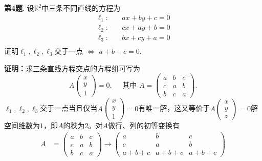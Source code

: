 \newpageorvspace

{\bf 第4题}. 设$\mathbb{R}^2$中三条不同直线的方程为
\begin{align*}
    \ell_1: & \quad ax+by+c=0 \\
    \ell_2: & \quad cx+ay+b=0 \\
    \ell_3: & \quad bx+cy+a=0 \\
\end{align*}
证明$\ell_1,\ell_2,\ell_3$交于一点 $\Longleftrightarrow$ $a+b+c=0$.

{\bf 证明：}求三条直线方程交点的方程组可写为
$$A\begin{pmatrix} x \\ y \\ 1 \end{pmatrix} = 0, \quad \text{ 其中 } A = \begin{pmatrix} a & b & c \\ c & a & b \\ b & c & a \end{pmatrix}.$$
$\ell_1,\ell_2,\ell_3$交于一点当且仅当$A\begin{pmatrix} x \\ y \\ 1 \end{pmatrix} = 0$有唯一解，这又等价于$A\begin{pmatrix} x \\ y \\ z \end{pmatrix} = 0$解空间维数为$1$，即$A$的秩为2。对$A$做行、列的初等变换有
\begin{align*}
A & = \begin{pmatrix} a & b & c \\ c & a & b \\ b & c & a \end{pmatrix} \to \begin{pmatrix} a & b & c \\ c & a & b \\ a+b+c & a+b+c & a+b+c \end{pmatrix}
\end{align*}


